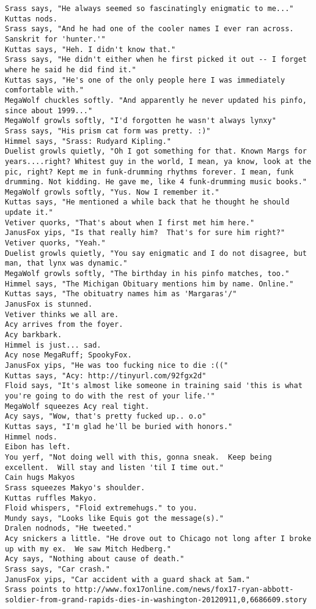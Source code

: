 \begin{verbatim}
Srass says, "He always seemed so fascinatingly enigmatic to me..."
Kuttas nods.
Srass says, "And he had one of the cooler names I ever ran across.  Sanskrit for 'hunter.'"
Kuttas says, "Heh. I didn't know that."
Srass says, "He didn't either when he first picked it out -- I forget where he said he did find it."
Kuttas says, "He's one of the only people here I was immediately comfortable with."
MegaWolf chuckles softly. "And apparently he never updated his pinfo, since about 1999..."
MegaWolf growls softly, "I'd forgotten he wasn't always lynxy"
Srass says, "His prism cat form was pretty. :)"
Himmel says, "Srass: Rudyard Kipling."
Duelist growls quietly, "Oh I got something for that. Known Margs for years....right? Whitest guy in the world, I mean, ya know, look at the pic, right? Kept me in funk-drumming rhythms forever. I mean, funk drumming. Not kidding. He gave me, like 4 funk-drumming music books."
MegaWolf growls softly, "Yus. Now I remember it."
Kuttas says, "He mentioned a while back that he thought he should update it."
Vetiver quorks, "That's about when I first met him here."
JanusFox yips, "Is that really him?  That's for sure him right?"
Vetiver quorks, "Yeah."
Duelist growls quietly, "You say enigmatic and I do not disagree, but man, that lynx was dynamic."
MegaWolf growls softly, "The birthday in his pinfo matches, too."
Himmel says, "The Michigan Obituary mentions him by name. Online."
Kuttas says, "The obituatry names him as 'Margaras'/"
JanusFox is stunned.
Vetiver thinks we all are.
Acy arrives from the foyer.
Acy barkbark.
Himmel is just... sad.
Acy nose MegaRuff; SpookyFox.
JanusFox yips, "He was too fucking nice to die :(("
Kuttas says, "Acy: http://tinyurl.com/92fgx2d"
Floid says, "It's almost like someone in training said 'this is what you're going to do with the rest of your life.'"
MegaWolf squeezes Acy real tight.
Acy says, "Wow, that's pretty fucked up.. o.o"
Kuttas says, "I'm glad he'll be buried with honors."
Himmel nods.
Eibon has left.
You yerf, "Not doing well with this, gonna sneak.  Keep being excellent.  Will stay and listen 'til I time out."
Cain hugs Makyos
Srass squeezes Makyo's shoulder.
Kuttas ruffles Makyo.
Floid whispers, "Floid extremehugs." to you.
Mundy says, "Looks like Equis got the message(s)."
Dralen nodnods, "He tweeted."
Acy snickers a little. "He drove out to Chicago not long after I broke up with my ex.  We saw Mitch Hedberg."
Acy says, "Nothing about cause of death."
Srass says, "Car crash."
JanusFox yips, "Car accident with a guard shack at 5am."
Srass points to http://www.fox17online.com/news/fox17-ryan-abbott-soldier-from-grand-rapids-dies-in-washington-20120911,0,6686609.story

\end{verbatim}
